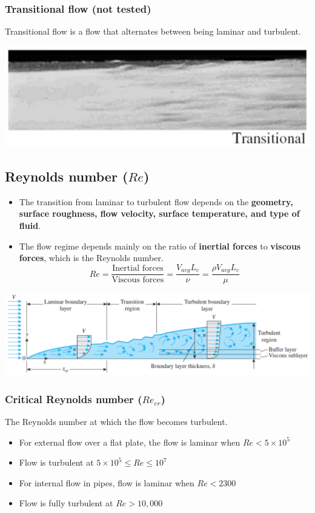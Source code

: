 \documentclass[11pt]{article}
\begin{document}
\subsubsection{Transitional flow (not tested)}
\label{sec:org25352de}
Transitional flow is a flow that alternates between being laminar and turbulent.
\begin{center}
\includegraphics[width=.9\linewidth]{./images/transitional-flow-photo.png}
\end{center}
\subsection{Reynolds number (\(Re\))}
\label{sec:org1ae1104}
\begin{itemize}
\item The transition from laminar to turbulent flow depends on the \textbf{geometry, surface roughness, flow velocity, surface temperature, and type of fluid}.
\item The flow regime depends mainly on the ratio of \textbf{inertial forces} to \textbf{viscous forces}, which is the Reynolds number.
\[Re = \frac{\text{Inertial forces}}{\text{Viscous forces}} = \frac{V_{avg} L_c}{\nu} = \frac{\rho V_{avg} L_c}{\mu}\]
\end{itemize}

\begin{center}
\includegraphics[width=.9\linewidth]{./images/reynolds-number-diagram.png}
\end{center}
\subsubsection{Critical Reynolds number (\(Re_{cr}\))}
\label{sec:orga1c1173}
The Reynolds number at which the flow becomes turbulent.
\begin{itemize}
\item For external flow over a flat plate, the flow is laminar when \(Re < 5 \times 10^5\)
\item Flow is turbulent at \(5 \times 10^5 \le Re \le 10^7\)
\item For internal flow in pipes, flow is laminar when \(Re < 2300\)
\item Flow is fully turbulent at \(Re > 10,000\)
\end{itemize}
\end{document}
